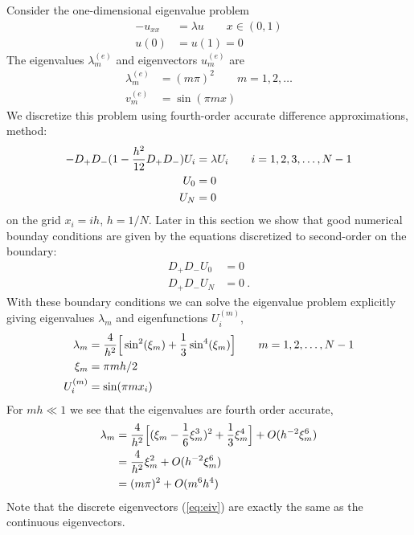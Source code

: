 Consider the one-dimensional eigenvalue problem
\begin{align}
   - u_{xx} & = \lambda u \qquad x\in (0,1)\\
      u(0)&=u(1)=0
\end{align}
The eigenvalues $\lambda^{(e)}_m$ and eigenvectors $u^{(e)}_m$ are
\begin{align}
     \lambda^{(e)}_m &= (m \pi)^2 \qquad m=1,2,\ldots \\
      v^{(e)}_m &= \sin( \pi m x ) \label{eq:ctseiv}
\end{align}
We discretize this problem using fourth-order accurate difference approximations,
method:
\begin{align}
   -  D_+ D_-( 1 - {h^2\over 12} D_+ D_- ) U_i & = \lambda U_i \qquad i=1,2,3,\ldots,N-1 \label{eq:pde4}\\
      U_0 &=0    \\ 
      U_N &= 0   
\end{align}
on the grid $x_i = i h$, $h=1/N$.
Later in this section we show that good numerical bounday conditions are given by
the equations discretized to second-order on the boundary:
\begin{align}
    D_+ D_- U_0 &= 0     \label{eq:eqBC}\\
    D_+ D_- U_N &= 0 ~.
\end{align}
With these boundary conditions we can solve the eigenvalue problem explicitly giving
eigenvalues $\lambda_m$ and eigenfunctions $U_i^{(m)}$,
\begin{align}
  \lambda_m &= {4\over h^2} \Big[ \sin^2(\xi_m)+ {1\over 3} \sin^4(\xi_m) \Big] \qquad m=1,2,\ldots,N-1\\
    \xi_m &= \pi m h/2 \\
  U_i^{(m)} &= \sin( \pi m x_i )   \label{eq:eiv}
\end{align}
For $ m h \ll 1 $ we see that the eigenvalues are fourth order accurate,
\begin{align*}
  \lambda_m &= {4\over h^2} \Big[ (\xi_m - {1\over6}\xi_m^3)^2 + {1\over 3}\xi_m^4 \Big] +O(h^{-2} \xi_m^6) \\
            &= {4\over h^2} \xi_m^2  + O(h^{-2}\xi_m^6) \\
            &= (m \pi)^2  + O(m^6 h^4) \\
\end{align*}            
Note that the discrete eigenvectors (\ref{eq:eiv}) are exactly the same as the
continuous eigenvectors.

